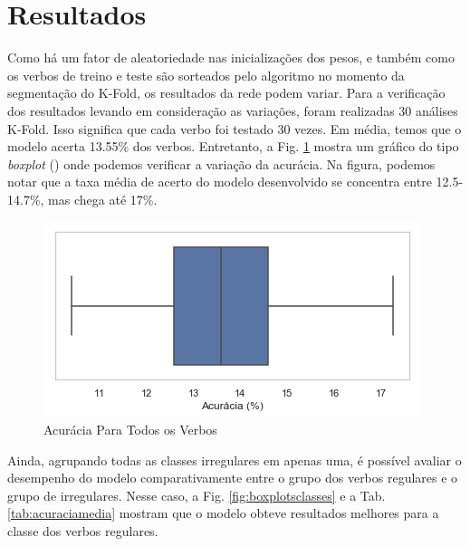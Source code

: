 \section{Resultados}
\label{sec:resultado}
Como há um fator de aleatoriedade nas inicializações dos pesos, e também como os verbos de treino e teste são sorteados pelo algoritmo no momento da segmentação do K-Fold, os resultados da rede podem variar. Para a verificação dos resultados levando em consideração as variações, foram realizadas 30 análises K-Fold. Isso significa que cada verbo foi testado 30 vezes. Em média, temos que o modelo acerta 13.55\% dos verbos. Entretanto, a Fig. \ref{fig:acc} mostra um gráfico do tipo \textit{boxplot} (\cite{2004:bussab}) onde podemos verificar a variação da acurácia. Na figura, podemos notar que a taxa média de acerto do modelo desenvolvido se concentra entre 12.5-14.7\%, mas chega até 17\%.

\begin{figure}[H]
  \centering
  \includegraphics[width=0.6\linewidth]{img/mean_accuracy.png}
  \caption{Acurácia Para Todos os Verbos}
  \label{fig:acc}
\end{figure}

Ainda, agrupando todas as classes irregulares em apenas uma, é possível avaliar o desempenho do modelo comparativamente entre o grupo dos verbos regulares e o grupo de irregulares.
Nesse caso, a Fig. \ref{fig:boxplotsclasses} e a Tab. \ref{tab:acuraciamedia} mostram que o modelo obteve resultados melhores para a classe dos verbos regulares. 

